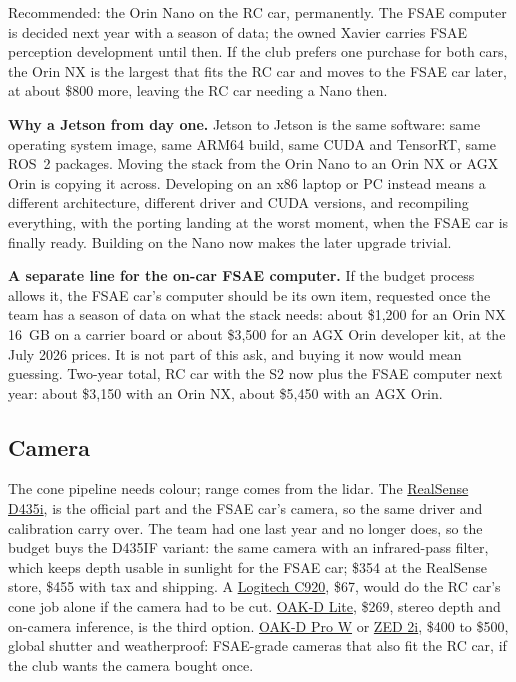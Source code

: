 \documentclass[11pt,a4paper]{article}
\begin{document}
\smallskip
Recommended: the Orin Nano on the RC car, permanently. The FSAE computer is decided next
year with a season of data; the owned Xavier carries FSAE perception development until then.
If the club prefers one purchase for both cars, the Orin NX is the largest that fits the RC
car and moves to the FSAE car later, at about \$800 more, leaving the RC car needing a Nano then.

\textbf{Why a Jetson from day one.} Jetson to Jetson is the same software: same operating
system image, same ARM64 build, same CUDA and TensorRT, same ROS~2 packages. Moving the stack
from the Orin Nano to an Orin NX or AGX Orin is copying it across. Developing on an x86 laptop
or PC instead means a different architecture, different driver and CUDA versions, and
recompiling everything, with the porting landing at the worst moment, when the FSAE car is
finally ready. Building on the Nano now makes the later upgrade trivial.

\textbf{A separate line for the on-car FSAE computer.} If the budget process allows it, the
FSAE car's computer should be its own item, requested once the team has a season of data on
what the stack needs: about \$1{,}200 for an Orin NX 16~GB on a carrier board or about
\$3{,}500 for an AGX Orin developer kit, at the July 2026 prices. It is not part of this ask,
and buying it now would mean guessing. Two-year total, RC car with the S2 now plus the FSAE
computer next year: about \$3{,}150 with an Orin NX, about \$5{,}450 with an AGX Orin.

\subsection*{Camera}
The cone pipeline needs colour; range comes from the lidar. The
\href{https://store.realsenseai.com/buy-intel-realsense-depth-camera-d435i.html}{RealSense D435i},
is the official part and the FSAE car's camera, so the same driver and calibration carry
over. The team had one last year and no longer does, so the budget buys the D435IF variant:
the same camera with an infrared-pass filter, which keeps depth usable in sunlight for the
FSAE car; \$354 at the RealSense store, \$455 with tax and shipping. A
\href{https://www.amazon.com/dp/B006JH8T3S}{Logitech C920}, \$67, would do the RC car's cone
job alone if the camera had to be cut.
\href{https://shop.luxonis.com/products/oak-d-lite-1}{OAK-D Lite}, \$269, stereo depth and
on-camera inference, is the third option.
\href{https://shop.luxonis.com/products/oak-d-pro-w}{OAK-D Pro W} or
\href{https://store.stereolabs.com/products/zed-2i}{ZED 2i}, \$400 to \$500, global shutter
and weatherproof: FSAE-grade cameras that also fit the RC car, if the club wants the camera
bought once.
\end{document}
